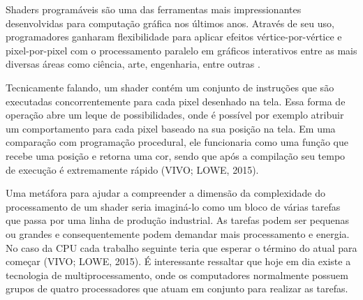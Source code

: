 Shaders programáveis são uma das ferramentas mais impressionantes desenvolvidas para computação gráfica nos últimos anos. Através de seu uso, programadores ganharam flexibilidade para aplicar efeitos vértice-por-vértice e pixel-por-pixel com o processamento paralelo em gráficos interativos entre as mais diversas áreas como ciência, arte, engenharia, entre outras \cite{bailey2007}.

	\begin{figure}[h!]
		\centering
	\end{figure}
	\nocite{figura5}

Tecnicamente falando, um shader contém um conjunto de instruções que são executadas concorrentemente para cada pixel desenhado na tela. Essa forma de operação abre um leque de possibilidades, onde é possível por exemplo atribuir um comportamento para cada pixel baseado na sua posição na tela. Em uma comparação com programação procedural, ele funcionaria como uma função que recebe uma posição e retorna uma cor, sendo que após a compilação seu tempo de execução é extremamente rápido (VIVO; LOWE, 2015)\nocite{bookOfShaders}.

Uma metáfora para ajudar a compreender a dimensão da complexidade do processamento de um shader seria imaginá-lo como um bloco de várias tarefas que passa por uma linha de produção industrial. As tarefas podem ser pequenas ou grandes e consequentemente podem demandar mais processamento e energia. No caso da CPU cada trabalho seguinte teria que esperar o término do atual para começar (VIVO; LOWE, 2015)\nocite{bookOfShaders}. É interessante ressaltar que hoje em dia existe a tecnologia de multiprocessamento, onde os computadores normalmente possuem grupos de quatro processadores que atuam em conjunto para realizar as tarefas.

